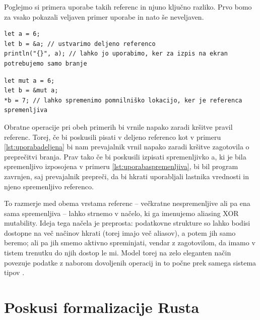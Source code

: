 \documentclass[a4paper,12pt,openright]{book}
\begin{document}
Poglejmo si primera uporabe takih referenc in njuno ključno razliko. Prvo bomo za vsako pokazali veljaven primer uporabe
in nato še neveljaven.

\begin{listing}[!ht]
	\begin{verbatim}
let a = 6;
let b = &a; // ustvarimo deljeno referenco
println("{}", a); // lahko jo uporabimo, ker za izpis na ekran potrebujemo samo branje
\end{verbatim}
	\caption{Uporaba deljene reference}
	\label{lst:uporabadeljena}
\end{listing}

\begin{listing}[!ht]
	\begin{verbatim}
let mut a = 6;
let b = &mut a;
*b = 7; // lahko spremenimo pomnilniško lokacijo, ker je referenca spremenljiva
\end{verbatim}
	\caption{Uporaba spremenljive reference}
	\label{lst:uporabaspremenljiva}
\end{listing}

Obratne operacije pri obeh primerih bi vrnile napako zaradi kršitve pravil referenc. Torej, če bi poskusili pisati
v deljeno referenco kot v primeru \ref{lst:uporabadeljena} bi nam prevajalnik vrnil napako zaradi kršitve zagotovila o preprečitvi
branja. Prav tako če bi poskusili izpisati spremenljivko a, ki je bila spremenljivo izposojena v primeru \ref{lst:uporabaspremenljiva},
bi bil program zavrnjen, saj prevajalnik prepreči, da bi hkrati uporabljali lastnika vrednosti in njeno spremenljivo referenco.

To razmerje med obema vrstama referenc – večkratne nespremenljive ali pa ena sama spremenljiva – lahko strnemo v načelo, ki ga imenujemo aliasing XOR mutability. Ideja tega načela je preprosta: podatkovne strukture so lahko bodisi dostopne na več načinov hkrati (torej imajo več aliasov), a potem jih samo beremo; ali pa jih smemo aktivno spreminjati, vendar z zagotovilom, da imamo v tistem trenutku do njih dostop le mi. Model torej na zelo eleganten način povezuje podatke z naborom dovoljenih operacij in to počne prek samega sistema tipov \cite{yanovskiGhostCellSeparatingPermissions2021}.

\section{Poskusi formalizacije Rusta}
\end{document}
